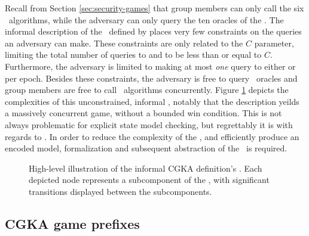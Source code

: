 Recall from Section \ref{sec:security-games} that group members can only call the six \CGKAdef\ algorithms, while the adversary can only query the ten oracles of the \CGKAsec.
The informal description of the \CGKAsec\ defined by \autocite{alwen2020security} places very few constraints on the queries an adversary can make.
These constraints are only related to the \(C\) parameter, limiting the total number of queries to  and  to be less than or equal to \(C\).
Furthermore, the adversary is limited to making at most \emph{one} query to either  or  per epoch.
Besides these constraints, the adversary is free to query \CGKAsec\ oracles and group members are free to call \CGKAdef\ algorithms concurrently.
Figure \ref{fig:CGKA-informal} depicts the complexities of this unconstrained, informal \CGKAsec, notably that the description yeilds a massively concurrent game, without a bounded win condition.
This is not always problematic for explicit state model checking, but regrettably it is with regards to \CGKAsec.
In order to reduce the complexity of the \CGKAsec, and efficiently produce an encoded model, formalization and subsequent abstraction of the \CGKAsec\ is required.

\begin{figure}[ht!]
\centering
\caption[Transition graph of informal CGKA definition]{%
\label{fig:CGKA-informal}%
High-level illustration of the informal CGKA definition's .%
Each depicted node represents a subcomponent of the , with significant transitions displayed between the subcomponents.
}%
\end{figure}

\hypertarget{sec:game-prefixes}{%
\subsection{CGKA game prefixes}\label{sec:game-prefixes}}

